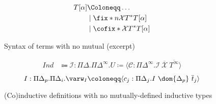 \begin{figure}
\centering
\begin{align*}
T[\alpha] &\Coloneqq \dots \\
    &\mid \fix*{n}{\mathcal{X}}{T^*}{T[\alpha]} \\
    &\mid \cofix*{}{\mathcal{X}}{T^*}{T[\alpha]}
\end{align*}
\caption{Syntax of \lang terms with no mutual \cofixpoints (excerpt)}
\label{fig:simpl-terms}
\end{figure}

\begin{figure}
\centering
\begin{align*}
\textit{Ind} &\Coloneqq \mathcal{I}: \Pi\Delta . \Pi\Delta^\infty . U \coloneqq \langle \mathcal{C}: \Pi\Delta^\infty . \mathcal{I} ~ \overline{\mathcal{X}} ~ \overline{T^\infty} \rangle
\end{align*}
\begin{equation*}
I: \Pi\Delta_p. \Pi\Delta_i . \varw_I \coloneqq \langle c_j: \Pi\Delta_j . I ~ \dom{\Delta_p} ~ \overline{t}_j \rangle
\end{equation*}
\caption{(Co)inductive definitions with no mutually-defined inductive types}
\label{fig:simpl-inductives}
\end{figure}

